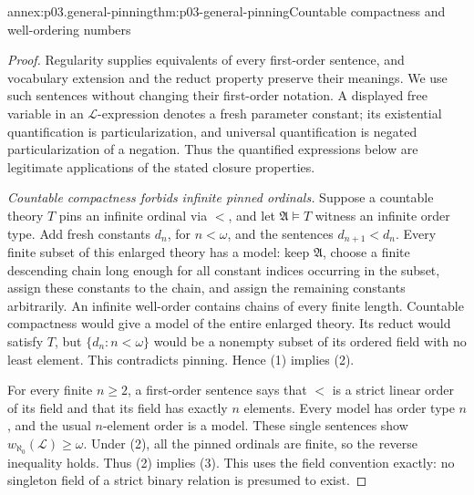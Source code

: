 \begin{annexitem}{annex:p03.general-pinning}{thm:p03-general-pinning}{Countable compactness and well-ordering numbers}
\begin{proof}
Regularity supplies equivalents of every first-order sentence, and
vocabulary extension and the reduct property preserve their meanings.
We use such sentences without changing their first-order notation.
A displayed free variable in an \(\mathscr L\)-expression denotes a
fresh parameter constant; its existential quantification is
particularization, and universal quantification is negated
particularization of a negation. Thus the quantified expressions below
are legitimate applications of the stated closure properties.

\emph{Countable compactness forbids infinite pinned ordinals.}
Suppose a countable theory \(T\) pins an infinite ordinal via \(<\),
and let \(\mathfrak A\models T\) witness an infinite order type.
Add fresh constants \(d_n\), for \(n<\omega\), and the sentences
\(d_{n+1}<d_n\). Every finite subset of this enlarged theory has a
model: keep \(\mathfrak A\), choose a finite descending chain long
enough for all constant indices occurring in the subset, assign these
constants to the chain, and assign the remaining constants arbitrarily.
An infinite well-order contains chains of every finite length.
Countable compactness would give a model of the entire enlarged theory.
Its reduct would satisfy \(T\), but \(\{d_n:n<\omega\}\) would be
a nonempty subset of its ordered field with no least element. This
contradicts pinning. Hence (1) implies (2).

For every finite \(n\geq2\), a first-order sentence says that \(<\)
is a strict linear order of its field and that its field has exactly
\(n\) elements. Every model has order type \(n\), and the usual
\(n\)-element order is a model. These single sentences show
\(w_{\aleph_0}(\mathscr L)\geq\omega\). Under (2), all the pinned
ordinals are finite, so the reverse inequality holds. Thus (2) implies (3).
This uses the field convention exactly: no singleton field of a strict
binary relation is presumed to exist.


\end{proof}
\end{annexitem}
